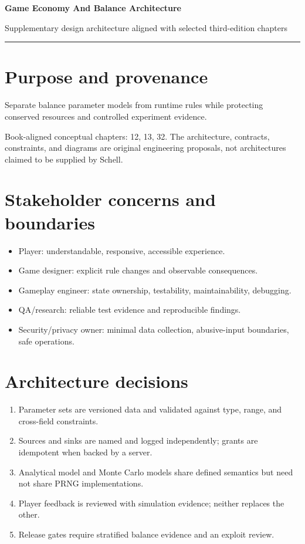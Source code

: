 \documentclass[11pt]{article}
\begin{document}
{\huge\bfseries\color{suiteblue} Game Economy And Balance Architecture}\par
\vspace{0.15in}
{\normalsize\color{suitegray} Supplementary design architecture aligned with selected third-edition chapters}\par
\vspace{0.15in}\hrule\vspace{0.15in}

\section{Purpose and provenance}
Separate balance parameter models from runtime rules while protecting conserved resources and controlled experiment evidence.

Book-aligned conceptual chapters: 12, 13, 32. The architecture, contracts, constraints, and diagrams are original engineering proposals, not architectures claimed to be supplied by Schell.


\section{Stakeholder concerns and boundaries}
\begin{itemize}
\item Player: understandable, responsive, accessible experience.
\item Game designer: explicit rule changes and observable consequences.
\item Gameplay engineer: state ownership, testability, maintainability, debugging.
\item QA/research: reliable test evidence and reproducible findings.
\item Security/privacy owner: minimal data collection, abusive-input boundaries, safe operations.
\end{itemize}

\section{Architecture decisions}
\begin{enumerate}
\item Parameter sets are versioned data and validated against type, range, and cross-field constraints.
\item Sources and sinks are named and logged independently; grants are idempotent when backed by a server.
\item Analytical model and Monte Carlo models share defined semantics but need not share PRNG implementations.
\item Player feedback is reviewed with simulation evidence; neither replaces the other.
\item Release gates require stratified balance evidence and an exploit review.
\end{enumerate}
\end{document}
